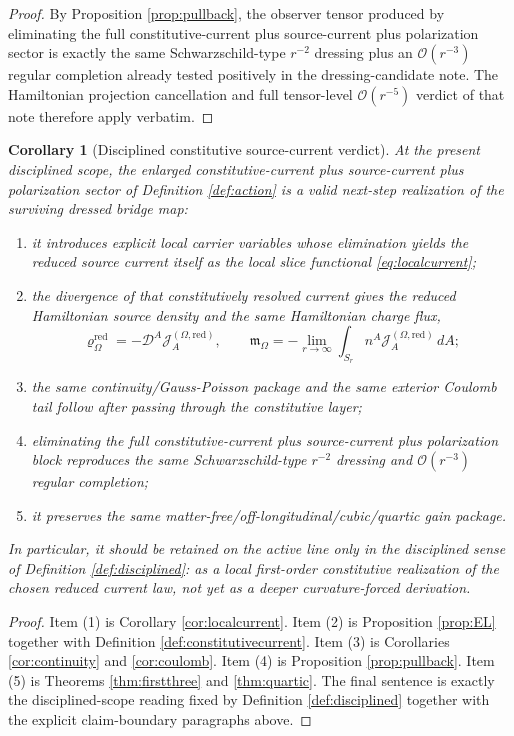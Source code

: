 \documentclass[11pt]{article}
\newcommand{\SpatialD}{\mathcal D}
\newcommand{\SourceDensityRed}{\varrho_\Omega^{\mathrm{red}}}
\newcommand{\SourceCurrentRed}{\mathcal J^{(\Omega,\mathrm{red})}}
\newcommand{\HamChargeOmega}{\mathfrak m_\Omega}
\newtheorem{corollary}{Corollary}
\begin{document}
\begin{proof}
By Proposition \ref{prop:pullback}, the observer tensor produced by eliminating the full constitutive-current plus source-current plus polarization sector is exactly the same Schwarzschild-type \(r^{-2}\) dressing plus an \(\mathcal O(r^{-3})\) regular completion already tested positively in the dressing-candidate note. The Hamiltonian projection cancellation and full tensor-level \(\mathcal O(r^{-5})\) verdict of that note therefore apply verbatim.
\end{proof}

\begin{corollary}[Disciplined constitutive source-current verdict]
\label{cor:verdict}
At the present disciplined scope, the enlarged constitutive-current plus source-current plus polarization sector of Definition \ref{def:action} is a valid next-step realization of the surviving dressed bridge map:
\begin{enumerate}
    \item it introduces explicit local carrier variables whose elimination yields the reduced source current itself as the local slice functional \eqref{eq:localcurrent};
    \item the divergence of that constitutively resolved current gives the reduced Hamiltonian source density and the same Hamiltonian charge flux,
    \[
    \SourceDensityRed=-\SpatialD^A\SourceCurrentRed_A,
    \qquad
    \HamChargeOmega=-\lim_{r\to\infty}\int_{S_r}n^A\SourceCurrentRed_A\,dA;
    \]
    \item the same continuity/Gauss-Poisson package and the same exterior Coulomb tail follow after passing through the constitutive layer;
    \item eliminating the full constitutive-current plus source-current plus polarization block reproduces the same Schwarzschild-type \(r^{-2}\) dressing and \(\mathcal O(r^{-3})\) regular completion;
    \item it preserves the same matter-free/off-longitudinal/cubic/quartic gain package.
\end{enumerate}
In particular, it should be retained on the active line only in the disciplined sense of Definition \ref{def:disciplined}: as a local first-order constitutive realization of the chosen reduced current law, not yet as a deeper curvature-forced derivation.
\end{corollary}

\begin{proof}
Item (1) is Corollary \ref{cor:localcurrent}. Item (2) is Proposition \ref{prop:EL} together with Definition \ref{def:constitutivecurrent}. Item (3) is Corollaries \ref{cor:continuity} and \ref{cor:coulomb}. Item (4) is Proposition \ref{prop:pullback}. Item (5) is Theorems \ref{thm:firstthree} and \ref{thm:quartic}.
The final sentence is exactly the disciplined-scope reading fixed by Definition \ref{def:disciplined} together with the explicit claim-boundary paragraphs above.
\end{proof}
\end{document}
